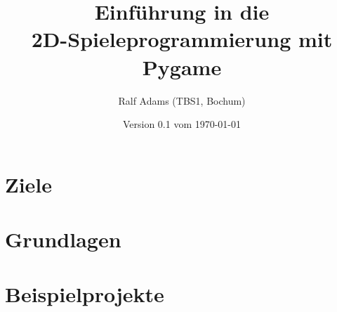 \documentclass[a4paper,12pt,oneside]{scrreprt}
\begin{document}
  \title{Einführung in die\\2D-Spieleprogrammierung mit Pygame}
  \author{Ralf Adams (TBS1, Bochum)}
  \date{Version 0.1 vom \today}
  \maketitle
  \tableofcontents
  \listoffigures
  \lstlistoflistings


\setlength{\parindent}{0.0em}
\setlength{\parskip}{1.0ex plus0.5ex minus0.5ex}
\setlength{\itemsep}{-0.3ex plus0.2ex}


\chapter{Ziele}
\chapter{Grundlagen}











\chapter{Beispielprojekte}


\printglossaries
\printindex
{}
\end{document}
